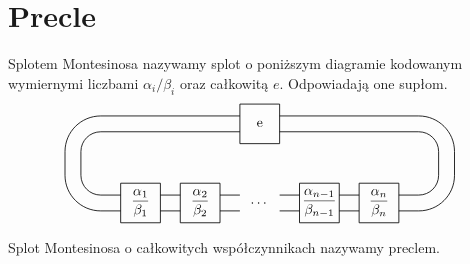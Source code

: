 \section{Precle} %
\label{sec:pretzel}
\begin{definition}
	Splotem Montesinosa nazywamy splot o poniższym diagramie 
	kodowanym wymiernymi liczbami $\alpha_i/\beta_i$ oraz całkowitą $e$.
	Odpowiadają one supłom.
	\[
	\begin{tikzpicture}[baseline=-0.65ex, scale=0.1]
		\draw[semithick] (-5, 5) rectangle (5, 15);
		\foreach \x in {0,1,3,4} {
			\draw[semithick] (15*\x-35, -15) rectangle (15*\x-25, -5);
		}
		\foreach \x in {0,1,2,3,4,5} {
			\draw[semithick] (15*\x-35, -8) to (15*\x-40, -8);
			\draw[semithick] (15*\x-35, -12) to (15*\x-40, -12);
		}
		\draw[semithick] (-40, -8) [in=down, out=left] to (-45, -3);
		\draw[semithick] (-40, -12) [in=down, out=left] to (-49, -3);

		\draw[semithick] (-40, 8) [in=up, out=left] to (-45, 3);
		\draw[semithick] (-40, 12) [in=up, out=left] to (-49, 3);

		\draw[semithick] (40, 8) [in=up, out=right] to (45, 3);
		\draw[semithick] (40, 12) [in=up, out=right] to (49, 3);

		\draw[semithick] (40, -8) [in=down, out=right] to (45, -3);
		\draw[semithick] (40, -12) [in=down, out=right] to (49, -3);

		\draw[semithick] (-45, -3)  to (-45, 3);
		\draw[semithick] (-49, -3)  to (-49, 3);
		\draw[semithick] (45, -3)  to (45, 3);
		\draw[semithick] (49, -3)  to (49, 3);

		\draw[semithick] (-5, 8)  to (-40, 8);
		\draw[semithick] ( 5, 8)  to ( 40, 8);
		\draw[semithick] (-5, 12)  to (-40, 12);
		\draw[semithick] ( 5, 12)  to ( 40, 12);

		\node at (0, 10) {e};
		\node at (0, -10) {\ldots};
		\node at (-15, -10) {$\displaystyle \frac{\alpha_2}{\beta_2}$};
		\node at (-30, -10) {$\displaystyle \frac{\alpha_1}{\beta_1}$};
		\node at (15, -10) {$\displaystyle \frac{\alpha_{n-1}}{\beta_{n-1}}$};
		\node at (30, -10) {$\displaystyle \frac{\alpha_n}{\beta_n}$};
	\end{tikzpicture}
	\]	
\end{definition}

\begin{definition} \label{pretzel_def}
	Splot Montesinosa o całkowitych współczynnikach nazywamy preclem.
\end{definition}

